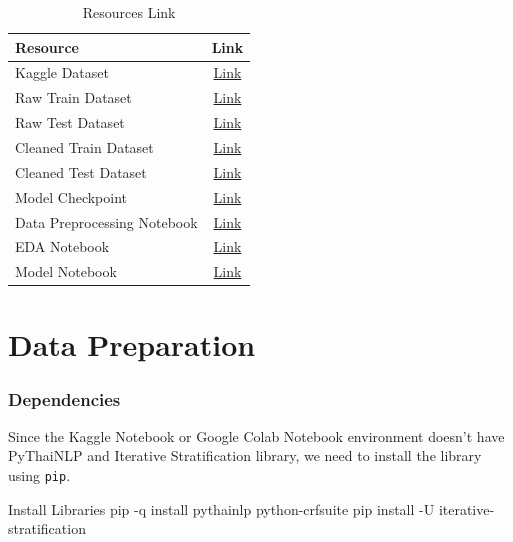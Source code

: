 \documentclass[12pt, a4paper]{article}
\begin{document}
            \begin{table}[h]
                \centering
                \begin{tabular}{|l|c|}
                    \hline
                    \rule{0pt}{2.5ex}
                    \textbf{Resource} & \textbf{Link} \\
                    \hline \hline
                    Kaggle Dataset & \href{https://www.kaggle.com/datasets/worralopsrichainont/2110446-dsde-midterm-dataset-cleaned}{Link} \\
                    Raw Train Dataset & \href{https://drive.google.com/uc?id=1viyCPfSO-3vCwEpEfS6KhinpFk9_Ozg2}{Link} \\
                    Raw Test Dataset & \href{https://drive.google.com/uc?id=1o0redlOH2bDN8iZqqBZVew7Bb80KIeXo}{Link} \\
                    Cleaned Train Dataset & \href{https://drive.google.com/uc?id=1b_UK7477inZgaCib2oH8pniF9R8EkIWU}{Link} \\
                    Cleaned Test Dataset & \href{https://drive.google.com/uc?id=1DIaNv7YWiFKhTSoSvaBZ4YRudal-3m51}{Link} \\
                    Model Checkpoint & \href{https://drive.google.com/uc?id=1twq0FrPmmeP9nU0m4JWdJGUOp-SwXCWF}{Link} \\
                    Data Preprocessing Notebook & \href{https://www.kaggle.com/code/worralopsrichainont/2110446-dsde-midterm-preprocess}{Link} \\
                    EDA Notebook & \href{https://www.kaggle.com/code/worralopsrichainont/2110446-dsde-midterm-eda}{Link} \\
                    Model Notebook & \href{https://www.kaggle.com/code/worralopsrichainont/2110446-dsde-midterm-model}{Link} \\
                    \hline
                \end{tabular}
                \caption{Resources Link}
            \end{table}

    \pagebreak

    \part{Data Preparation}
        \section{Dependencies}
            Since the Kaggle Notebook or Google Colab Notebook environment doesn't have PyThaiNLP
            and Iterative Stratification library, we need to install the library using \texttt{pip}.
            \begin{codeblock}[minted language=bat]{Install Libraries}
                pip -q install pythainlp python-crfsuite
                pip install -U iterative-stratification
            \end{codeblock}
\end{document}
